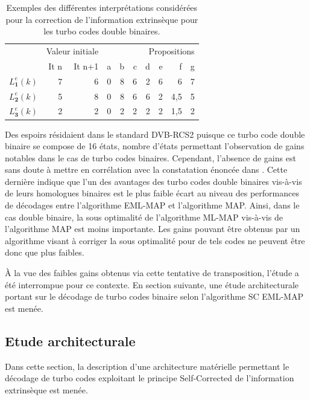 \begin{table}[t]
	\centering
	\begin{tabular}{lrrrrrrrrr}
		\toprule
			&\multicolumn{2}{l}{Valeur initiale} & \multicolumn{7}{r}{Propositions} \\
			\cmidrule(r){2-3} \cmidrule(r){4-10} 
		   & It n & It n+1 & a & b & c & d &e &f &g\\ 
		 \cmidrule(r){2-2} \cmidrule(r){3-3} \cmidrule(l){4-10} 
		$L^e_\mathbf{1}(k)$& 7 & 6 & 0 & 8 & 6 & 2 & 6 & 6  & 7 \\
		$L^e_\mathbf{2}(k)$& 5 & 8 & 0 & 8 & 6 & 6 & 2 & 4,5 & 5 \\
		$L^e_\mathbf{3}(k)$& 2 & 2 & 0 & 2 & 2 & 2 & 2 & 1,5 & 2 \\
		\bottomrule
	\end{tabular}
	\caption{Exemples des différentes interprétations considérées pour la correction de l'information extrinsèque pour les turbo codes double binaires.}
	\label{tab:exsc}
\end{table}

Des espoirs résidaient dans le standard DVB-RCS2 puisque ce turbo code double binaire se compose de 16 états, nombre 
d'états permettant l'observation de gains notables dans le cas de turbo codes binaires. Cependant, l'absence de gains 
est sans doute à mettre en corrélation avec la constatation énoncée dans \cite{doublebinadvantages}. Cette dernière
indique que l'un des avantages des turbo codes double binaires vis-à-vis de leurs homologues binaires est le plus faible 
écart au niveau des performances de décodages entre l’algorithme EML-MAP et l'algorithme MAP. Ainsi, dans le cas double 
binaire, la sous optimalité de l'algorithme ML-MAP vis-à-vis de l'algorithme MAP 
est moins importante. Les gains pouvant être obtenus par un algorithme visant à corriger la sous optimalité pour de tels 
codes ne peuvent être donc que plus faibles.

À la vue des faibles gains obtenus via cette tentative de transposition, l'étude a été interrompue
pour ce contexte. En section suivante, une étude architecturale portant sur le décodage de turbo codes binaire selon 
l'algorithme SC EML-MAP est menée.

\subsection{Etude architecturale}
Dans cette section, la description d'une architecture matérielle permettant le décodage de turbo codes exploitant le principe 
Self-Corrected de l'information extrinsèque est menée. 

